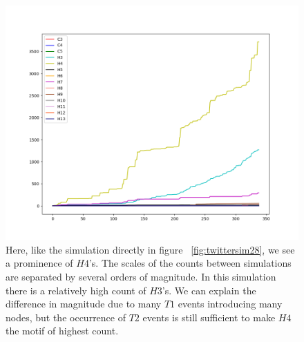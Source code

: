 \begin{figure}[h!]
    \includegraphics[width=16cm]{Images/twitter_sim_for_stats_3_0.8_0.8.png}
    \centering
    \caption{Here, like the simulation directly in figure ~\ref{fig:twittersim28}, we see a prominence of $H4$'s. The scales of the 
    counts between simulations are separated by several orders of magnitude. In this simulation
     there is a relatively high count of $H3$'s. We can explain the difference in magnitude
     due to many $T1$ events introducing many nodes, but the occurrence of $T2$ events 
     is still sufficient to make $H4$ the motif of highest count.}
     \label{fig:thij0808}
\end{figure}


